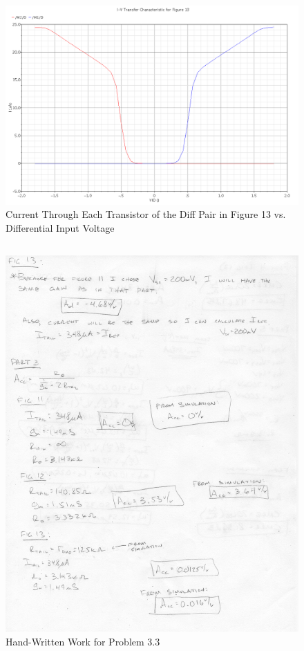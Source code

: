 \documentclass{article}
\begin{document}
\begin{figure}[H]
\centering
\includegraphics[width=6in]{p3_2c}
\caption{Current Through Each Transistor of the Diff Pair in Figure 13 vs. Differential Input Voltage}
\label{3_2c}
\end{figure}

\subsection{}

\begin{figure}[H]
\centering
\includegraphics[width=6in]{1_10}
\caption{Hand-Written Work for Problem 3.3}
\label{3_3}
\end{figure}
\end{document}
